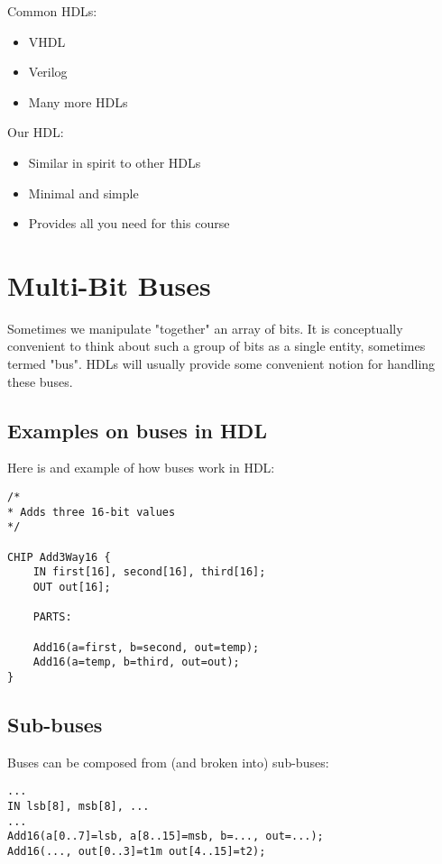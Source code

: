 Common HDLs:

\begin{itemize}
    \item VHDL
    \item Verilog
    \item Many more HDLs
\end{itemize}

Our HDL:

\begin{itemize}
    \item Similar in spirit to other HDLs
    \item Minimal and simple
    \item Provides all you need for this course
\end{itemize}

\section{Multi-Bit Buses}

Sometimes we manipulate "together" an array of bits.
It is conceptually convenient to think about such a group of bits
as a single entity, sometimes termed "bus".
HDLs will usually provide some convenient notion for handling
these buses.

\subsection{Examples on buses in HDL}

Here is and example of how buses work in HDL:

\begin{lstlisting}
/*
* Adds three 16-bit values
*/

CHIP Add3Way16 {
    IN first[16], second[16], third[16];
    OUT out[16];

    PARTS:

    Add16(a=first, b=second, out=temp);
    Add16(a=temp, b=third, out=out);
}
\end{lstlisting}

\subsection{Sub-buses}

Buses can be composed from (and broken into) sub-buses:

\begin{lstlisting}
...
IN lsb[8], msb[8], ...
...
Add16(a[0..7]=lsb, a[8..15]=msb, b=..., out=...);
Add16(..., out[0..3]=t1m out[4..15]=t2);
\end{lstlisting}

